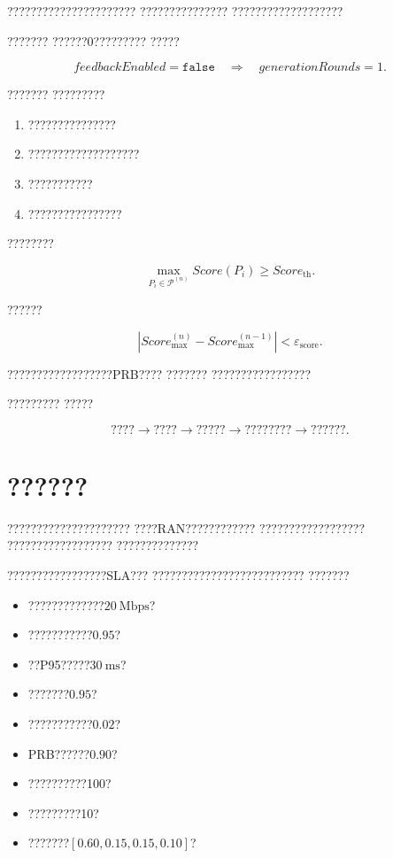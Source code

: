 ??????????????????????
???????????????
???????????????????

???????
??????0?????????
?????

\begin{equation}
feedbackEnabled
=
\texttt{false}
\quad\Longrightarrow\quad
generationRounds=1.
\label{eq:feedback_disabled_reduced}
\end{equation}

???????
?????????

\begin{enumerate}[label=\arabic*)]
    \item ???????????????
    \item ???????????????????
    \item ???????????
    \item ????????????????
\end{enumerate}

????????

\begin{equation}
\max_{P_i\in\mathcal{P}^{(n)}}
Score(P_i)
\geq
Score_{\mathrm{th}}.
\label{eq:score_threshold_stop_reduced}
\end{equation}

??????

\begin{equation}
\left|
Score_{\max}^{(n)}
-
Score_{\max}^{(n-1)}
\right|
<
\varepsilon_{\mathrm{score}}.
\label{eq:score_convergence_reduced}
\end{equation}

??????????????????PRB????
???????
?????????????????

?????????
?????

\begin{equation}
\text{????}
\longrightarrow
\text{????}
\longrightarrow
\text{?????}
\longrightarrow
\text{????????}
\longrightarrow
\text{??????}.
\label{eq:candidate_policy_to_ranked_policy}
\end{equation}

\section{??????}
\label{sec:simulation_results}

?????????????????????
????RAN????????????
??????????????????
??????????????????
??????????????

?????????????????SLA???
??????????????????????????
???????

\begin{itemize}
    \item ?????????????$20~\mathrm{Mbps}$?
    \item ???????????$0.95$?
    \item ??P95?????$30~\mathrm{ms}$?
    \item ???????$0.95$?
    \item ???????????$0.02$?
    \item PRB??????$0.90$?
    \item ??????????100?
    \item ?????????10?
    \item ???????$[0.60,0.15,0.15,0.10]$?
\end{itemize}

